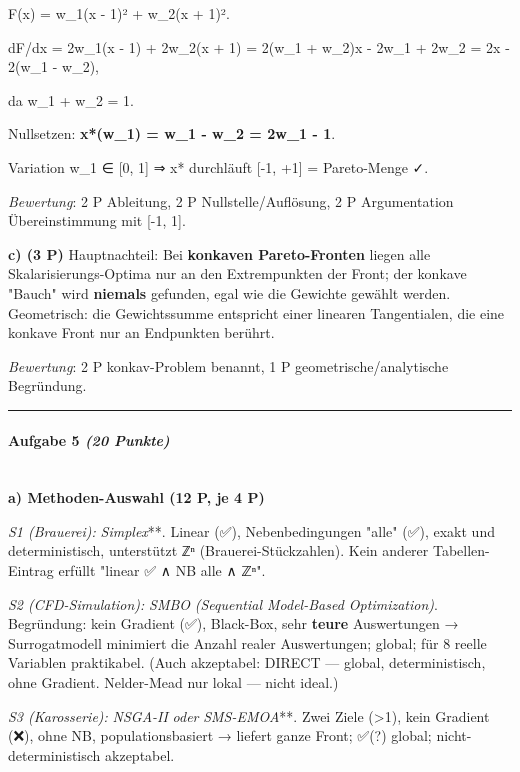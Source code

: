 \documentclass[11pt, a4paper]{article}
\begin{document}
F(x) = w\_1(x - 1)² + w\_2(x + 1)².


dF/dx = 2w\_1(x - 1) + 2w\_2(x + 1) = 2(w\_1 + w\_2)x - 2w\_1 + 2w\_2 = 2x - 2(w\_1 - w\_2),


da w\_1 + w\_2 = 1.


Nullsetzen: \textbf{x*(w\_1) = w\_1 - w\_2 = 2w\_1 - 1}.


Variation w\_1 ∈ [0, 1] ⇒ x* durchläuft [-1, +1] = Pareto-Menge ✓.


\textit{Bewertung}: 2 P Ableitung, 2 P Nullstelle/Auflösung, 2 P Argumentation Übereinstimmung mit [-1, 1].


\textbf{c) (3 P)} Hauptnachteil: Bei \textbf{konkaven Pareto-Fronten} liegen alle Skalarisierungs-Optima nur an den Extrempunkten der Front; der konkave "Bauch" wird \textbf{niemals} gefunden, egal wie die Gewichte gewählt werden. Geometrisch: die Gewichtssumme entspricht einer linearen Tangentialen, die eine konkave Front nur an Endpunkten berührt.


\textit{Bewertung}: 2 P konkav-Problem benannt, 1 P geometrische/analytische Begründung.



\noindent\textcolor{rulegray}{\rule{\linewidth}{0.4pt}}


\paragraph{Aufgabe 5 \textit{(20 Punkte)}}\mbox{}\\[2pt]

\textbf{a) Methoden-Auswahl (12 P, je 4 P)}


\textit{S1 (Brauerei): }\textit{Simplex}**. Linear (✅), Nebenbedingungen "alle" (✅), exakt und deterministisch, unterstützt ℤⁿ (Brauerei-Stückzahlen). Kein anderer Tabellen-Eintrag erfüllt "linear ✅ ∧ NB alle ∧ ℤⁿ".


\textit{S2 (CFD-Simulation): }\textit{SMBO}\textit{ (Sequential Model-Based Optimization)}. Begründung: kein Gradient (✅), Black-Box, sehr \textbf{teure} Auswertungen → Surrogatmodell minimiert die Anzahl realer Auswertungen; global; für 8 reelle Variablen praktikabel. (Auch akzeptabel: DIRECT — global, deterministisch, ohne Gradient. Nelder-Mead nur lokal — nicht ideal.)


\textit{S3 (Karosserie): }\textit{NSGA-II}\textit{ oder }\textit{SMS-EMOA}**. Zwei Ziele (>1), kein Gradient (❌), ohne NB, populationsbasiert → liefert ganze Front; ✅(?) global; nicht-deterministisch akzeptabel.
\end{document}
